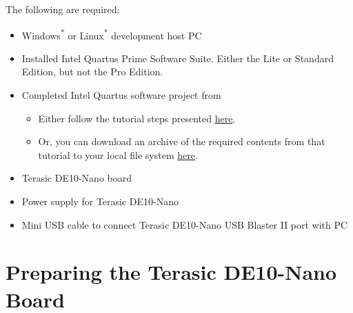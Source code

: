 \begin{flushleft}
\noindent
The following are required:

\begin{itemize}

\item Windows\textsuperscript{*} or Linux\textsuperscript{*} development host PC

\item Installed Intel\textsuperscript{\textregistered} Quartus\textsuperscript{\textregistered} Prime Software Suite.  Either the Lite or Standard Edition, but not the Pro Edition.

\item Completed Intel Quartus software project from 

\begin{itemize}

\item Either follow the tutorial steps presented \href{\TheReleasesURL/writeup_MyFirstQsysSystem.pdf}{\underline{here}}.

\item Or, you can download an archive of the required contents from that tutorial to your local file system \href{\TheReleasesURL/blink_for_InteractSystemConsole.zip}{\underline{here}}.

\end{itemize}

\item Terasic DE10-Nano board

\item Power supply for Terasic DE10-Nano

\item Mini USB cable to connect Terasic DE10-Nano USB Blaster II port with PC

\end{itemize}

\end{flushleft}

\section*{Preparing the Terasic DE10-Nano Board}

